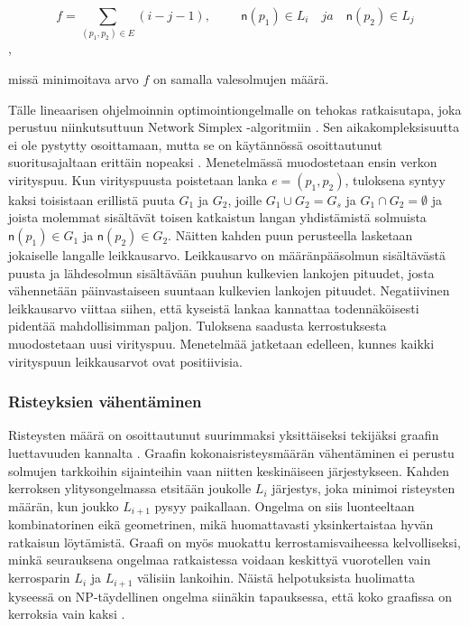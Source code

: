 \documentclass[finnish,12pt]{article}
\begin{document}
\begin{equation}
f=\displaystyle\sum\limits_{(p_1 ,p_2) \in E} (i - j - 1), \hspace{1cm}
\mathsf{n}(p_1) \in L_i \quad ja \quad \mathsf{n}(p_2) \in L_j
\end{equation},

missä minimoitava arvo $f$ on samalla valesolmujen määrä.

Tälle lineaarisen ohjelmoinnin optimointiongelmalle on tehokas ratkaisutapa, joka perustuu niinkutsuttuun Network Simplex -algoritmiin \cite{RefWorks:71}.
Sen aikakompleksisuutta ei ole pystytty osoittamaan, mutta se on käytännössä osoittautunut suoritusajaltaan erittäin nopeaksi  \cite{RefWorks:28}.
Menetelmässä muodostetaan ensin verkon virityspuu.
Kun virityspuusta poistetaan lanka $e=(p_1, p_2)$, tuloksena syntyy kaksi toisistaan erillistä puuta $G_1$ ja $G_2$, joille $G_1 \cup G_2 = G_s$ ja $G_1 \cap G_2 = \emptyset$ ja joista molemmat sisältävät toisen katkaistun langan yhdistämistä solmuista $\mathsf{n}(p_1) \in G_1$ ja $\mathsf{n}(p_2) \in G_2$.
Näitten kahden puun perusteella lasketaan jokaiselle langalle leikkausarvo.
Leikkausarvo on määränpääsolmun sisältävästä puusta ja lähdesolmun sisältävään puuhun kulkevien lankojen pituudet,
josta vähennetään päinvastaiseen suuntaan kulkevien lankojen pituudet.
Negatiivinen leikkausarvo viittaa siihen, että kyseistä lankaa kannattaa todennäköisesti pidentää mahdollisimman paljon.
Tuloksena saadusta kerrostuksesta muodostetaan uusi virityspuu. Menetelmää jatketaan edelleen, kunnes kaikki virityspuun leikkausarvot ovat positiivisia.


		\subsubsection{Risteyksien vähentäminen}

Risteysten määrä on osoittautunut suurimmaksi yksittäiseksi tekijäksi graafin luettavuuden kannalta \cite{RefWorks:47}. 
Graafin kokonaisristeysmäärän vähentäminen ei perustu solmujen tarkkoihin sijainteihin vaan niitten keskinäiseen järjestykseen.
Kahden kerroksen ylitysongelmassa etsitään joukolle $L_i$ järjestys, joka minimoi risteysten määrän, kun joukko $L_{i+1}$ pysyy paikallaan.
Ongelma on siis luonteeltaan kombinatorinen eikä geometrinen, mikä huomattavasti yksinkertaistaa hyvän ratkaisun löytämistä.
Graafi on myös muokattu kerrostamisvaiheessa kelvolliseksi, minkä seurauksena ongelmaa ratkaistessa voidaan keskittyä vuorotellen vain kerrosparin $L_i$ ja $L_{i+1}$ välisiin lankoihin.
Näistä helpotuksista huolimatta kyseessä on NP-täydellinen ongelma siinäkin tapauksessa, että koko graafissa on kerroksia vain kaksi \cite{RefWorks:40}.
\end{document}
